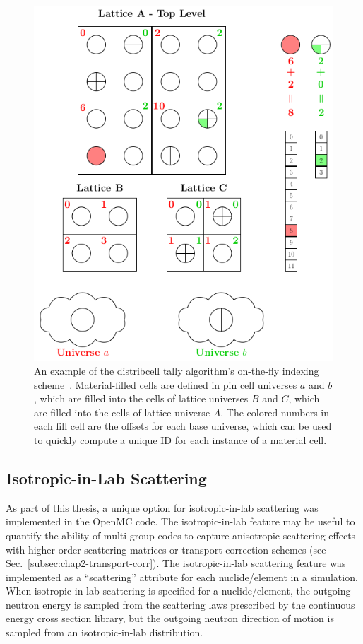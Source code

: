 \begin{figure}
  \centering
  \includegraphics[width=\linewidth]{figures/workflow/openmc/distribcells}
\caption[The distributed cell tally indexing algorithm]{An example of the distribcell tally algorithm's on-the-fly indexing scheme~\cite{lax2014distribcell}. Material-filled cells are defined in pin cell universes $a$ and $b$, which are filled into the cells of lattice universes $B$ and $C$, which are filled into the cells of lattice universe $A$.  The colored numbers in each fill cell are the offsets for each base universe, which can be used to quickly compute a unique ID for each instance of a material cell.}
\label{fig:indexing-scheme}
\end{figure}

\subsection{Isotropic-in-Lab Scattering}
\label{subsec:chap4-iso-in-lab}

As part of this thesis, a unique option for isotropic-in-lab scattering was implemented in the OpenMC code. The isotropic-in-lab feature may be useful to quantify the ability of multi-group codes to capture anisotropic scattering effects with higher order scattering matrices or transport correction schemes (see Sec.~\ref{subsec:chap2-transport-corr}). The isotropic-in-lab scattering feature was implemented as a ``scattering'' attribute for each nuclide/element in a simulation. When isotropic-in-lab scattering is specified for a nuclide/element, the outgoing neutron energy is sampled from the scattering laws prescribed by the continuous energy cross section library, but the outgoing neutron direction of motion is sampled from an isotropic-in-lab distribution. 

